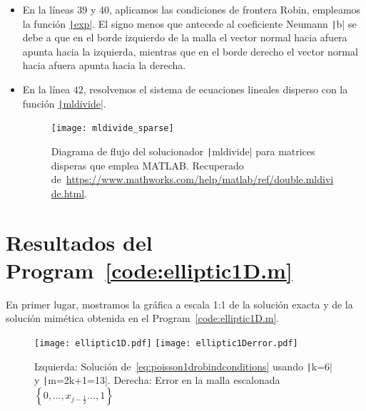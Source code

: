 \begin{itemize}
    \item

          En la líneas $39$ y $40$, aplicamos las condiciones de
          frontera Robin, empleamos la función
          \href{https://docs.octave.org/latest/Exponents-and-Logarithms.html#XREFexp}{\texttt|exp|}.
          El signo menos que antecede al coeficiente Neumann
          \texttt|b| se debe a que en el borde izquierdo
          de la malla el vector normal hacia afuera apunta hacia la
          izquierda, mientras que en el borde derecho el vector
          normal hacia afuera apunta hacia la derecha.

    \item

          En la línea $42$, resolvemos el sistema de ecuaciones lineales
          disperso con la función \href{https://docs.octave.org/latest/Arithmetic-Ops.html#index-mldivide}{\texttt|mldivide|}.

          \begin{figure}[ht!]
              \centering
              \texttt{[image: mldivide\_sparse]}
              \caption{Diagrama de flujo del solucionador
                  \texttt|mldivide| para matrices
                  disperas que emplea MATLAB.
                  Recuperado de~\url{https://www.mathworks.com/help/matlab/ref/double.mldivide.html}.}
          \end{figure}
\end{itemize}

\section*{Resultados del Program~\ref{code:elliptic1D.m}}

En primer lugar, mostramos la gráfica a escala 1:1 de la solución
exacta y de la solución mimética obtenida en el Program~\ref{code:elliptic1D.m}.

\begin{figure}[ht!]
    \centering
    \texttt{[image: elliptic1D.pdf]}
    \texttt{[image: elliptic1Derror.pdf]}
    \caption{Izquierda: Solución de~\eqref{eq:poisson1drobindconditions}
        usando \texttt|k=6| y \texttt|m=2k+1=13|.
        Derecha: Error en la malla escalonada
        \begin{math}
            \left\{
            0,
            \dotsc,
            x_{j-\frac{1}{2}}
            \dotsc,
            1
            \right\}
        \end{math}}
\end{figure}

